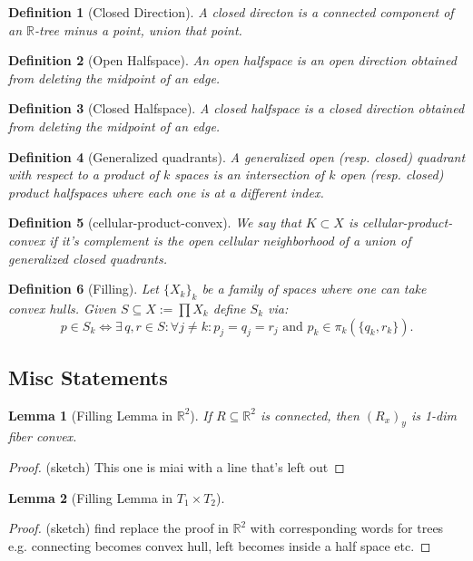 \documentclass{article}
\newcommand{\rxy}{(R_x)_y}
\theoremstyle{mystyle}
\newtheorem{lem}{Lemma}[section]
\newtheorem{defn}{Definition}
\theoremstyle{remark}
\begin{document}
\begin{defn}[Closed Direction] A closed directon is a connected component of an \(\mathbb{R}\)-tree minus a point, union that point.
\end{defn}
\begin{defn}[Open Halfspace] An open halfspace is an open direction obtained from deleting the midpoint of an edge.
\end{defn}
\begin{defn}[Closed Halfspace] A closed halfspace is a closed direction obtained from deleting the midpoint of an edge.
\end{defn}
\begin{defn}[Generalized quadrants] A generalized open (resp. closed) quadrant with respect to a product of \(k\) spaces is an intersection of \(k\) open (resp. closed) product halfspaces where each one is at a different index.
\end{defn}
\begin{defn}[cellular-product-convex] We say that \(K \subset X\) is cellular-product-convex if it's complement is the open cellular neighborhood of a union of generalized closed quadrants.
\end{defn}

\begin{defn}
	[Filling]
	Let \(\{X_{k}\}_{k}\) be a family of spaces where one can take convex hulls. Given \(S \subseteq X := \prod X_{k}\) define \(S_{k}\) via: \[p \in S_{k} \iff \exists \,q,r \in S: \forall j \neq k: p_{j} = q_{j} = r_{j} \text{ and } p_{k} \in \pi_{k} (\{q_{k} , r_{k}\}).\] 
\end{defn}

\subsection{Misc Statements}

\begin{lem}
    [Filling Lemma in \(\mathbb{R}^{2}\)]
	\label{lem:fillr2}
	If \(R \subseteq \mathbb{R}^{2}\) is connected, then \(\rxy\) is 1-dim fiber convex.
\end{lem}
\begin{proof}
    (sketch) This one is miai with a line that's left out
\end{proof}
\begin{lem}
    [Filling Lemma in \(T_{1} \times T_{2}\)]
	\label{lem:fillt2}
\end{lem}
\begin{proof}
    (sketch) find replace the proof in \(\mathbb{R}^{2}\) with corresponding words for trees e.g. connecting becomes convex hull, left becomes inside a half space etc.
\end{proof}
\end{document}
